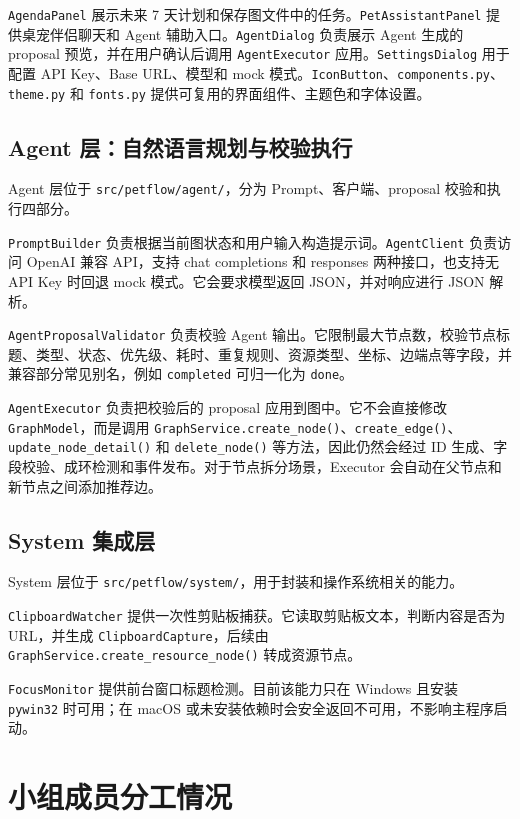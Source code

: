 \documentclass[UTF8,a4paper,12pt,fontset=none]{ctexart}
\begin{document}
\texttt{AgendaPanel} 展示未来 7 天计划和保存图文件中的任务。\texttt{PetAssistantPanel} 提供桌宠伴侣聊天和 Agent 辅助入口。\texttt{AgentDialog} 负责展示 Agent 生成的 proposal 预览，并在用户确认后调用 \texttt{AgentExecutor} 应用。\texttt{SettingsDialog} 用于配置 API Key、Base URL、模型和 mock 模式。\texttt{IconButton}、\texttt{components.py}、\texttt{theme.py} 和 \texttt{fonts.py} 提供可复用的界面组件、主题色和字体设置。

\subsection{Agent 层：自然语言规划与校验执行}

Agent 层位于 \texttt{src/petflow/agent/}，分为 Prompt、客户端、proposal 校验和执行四部分。

\texttt{PromptBuilder} 负责根据当前图状态和用户输入构造提示词。\texttt{AgentClient} 负责访问 OpenAI 兼容 API，支持 chat completions 和 responses 两种接口，也支持无 API Key 时回退 mock 模式。它会要求模型返回 JSON，并对响应进行 JSON 解析。

\texttt{AgentProposalValidator} 负责校验 Agent 输出。它限制最大节点数，校验节点标题、类型、状态、优先级、耗时、重复规则、资源类型、坐标、边端点等字段，并兼容部分常见别名，例如 \texttt{completed} 可归一化为 \texttt{done}。

\texttt{AgentExecutor} 负责把校验后的 proposal 应用到图中。它不会直接修改 \texttt{GraphModel}，而是调用 \texttt{GraphService.create\_node()}、\texttt{create\_edge()}、\texttt{update\_node\_detail()} 和 \texttt{delete\_node()} 等方法，因此仍然会经过 ID 生成、字段校验、成环检测和事件发布。对于节点拆分场景，Executor 会自动在父节点和新节点之间添加推荐边。

\subsection{System 集成层}

System 层位于 \texttt{src/petflow/system/}，用于封装和操作系统相关的能力。

\texttt{ClipboardWatcher} 提供一次性剪贴板捕获。它读取剪贴板文本，判断内容是否为 URL，并生成 \texttt{ClipboardCapture}，后续由 \texttt{GraphService.create\_resource\_node()} 转成资源节点。

\texttt{FocusMonitor} 提供前台窗口标题检测。目前该能力只在 Windows 且安装 \texttt{pywin32} 时可用；在 macOS 或未安装依赖时会安全返回不可用，不影响主程序启动。

\section{小组成员分工情况}
\end{document}
